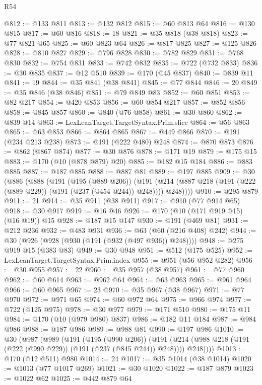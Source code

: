 \begin{lexlean}{R54}
\begin{coremodule}
@812 := @133 @811
@813 := @132 @812
@815 := @60 @813 @64
@816 := @130 @815
@817 := @60 @816
@818 := 18
@821 := @35 @818 (@38 @818)
@823 := @77 @821 @65
@825 := @60 @823 @64
@826 := @817 @825
@827 := @125 @826
@828 := @810 @827
@829 := @796 @828
@830 := @782 @829
@831 := @768 @830
@832 := @754 @831
@833 := @742 @832
@835 := @722 (@732 @833)
@836 := @30 @835
@837 := @12 @510
@839 := @170 (@45 @837)
@840 := @839 @11
@841 := 19
@844 := @35 @841 (@38 @841)
@845 := @77 @844
@846 := 20
@849 := @35 @846 (@38 @846)
@851 := @79 @849 @83
@852 := @60 @851
@853 := @82 @217
@854 := @420 @853
@856 := @60 @854 @217
@857 := @852 @856
@858 := @845 @857
@860 := @840 (@76 @858)
@861 := @30 @860
@862 := @839 @14
@863 := LexLeanTarget.TargetSyntax.Prim.slice
@864 := @56 @863
@865 := @63 @853
@866 := @864 @865
@867 := @449 @866
@870 := @191 (@234 @213 @238)
@873 := @191 (@222 @480) @248
@874 := @870 @873
@876 := @862 (@867 @874)
@877 := @30 @876
@878 := @171 @19
@879 := @175 @15
@883 := @170 (@10 (@878 @879) @20)
@885 := @182 @15 @184
@886 := @883 @885
@887 := @187 @885
@888 := @887 @81
@889 := @197 @885
@909 := @30
    (@886
      (@888
        (@191
          (@195 (@889 @206))
          (@191 (@214 (@887 @218 (@191 (@222 (@889 @229)) (@191 (@237 (@454 @244)) @248)))) @248))))
@910 := @295 @879
@911 := 21
@914 := @35 @911 (@38 @911)
@917 := @910 (@77 @914 @65)
@918 := @30 @917
@919 := @16 @46
@926 := @170 (@10 (@171 @919 @15) (@16 @19)) @15
@928 := @187 @15 @147
@930 := @191 (@469 @81)
@931 := @212 @236
@932 := @483 @931
@936 := @63 (@60 (@216 @408) @242)
@944 := @30 (@926 (@928 (@930 (@191 (@932 (@497 @936)) @248))))
@948 := @275 @919 @15 (@383 @83)
@949 := @30 @948
@951 := @512 (@175 @525)
@952 := LexLeanTarget.TargetSyntax.Prim.index
@955 := @951 (@56 @952 @282)
@956 := @30 @955
@957 := 22
@960 := @35 @957 (@38 @957)
@961 := @77 @960
@962 := @60 @614
@963 := @962 @64
@964 := @63 @963
@965 := @961 @964
@966 := @60 @965
@967 := 23
@970 := @35 @967 (@38 @967)
@971 := @77 @970
@972 := @971 @65
@974 := @60 @972 @64
@975 := @966 @974
@977 := @722 (@125 @975)
@978 := @30 @977
@979 := @171 @510
@980 := @175 @11
@984 := @170 (@10 (@979 @980) @837)
@986 := @182 @11 @184
@987 := @984 @986
@988 := @187 @986
@989 := @988 @81
@990 := @197 @986
@1010 := @30
    (@987
      (@989
        (@191
          (@195 (@990 @206))
          (@191 (@214 (@988 @218 (@191 (@222 (@990 @229)) (@191 (@237 (@845 @244)) @248)))) @248))))
@1013 := @170 (@12 @511) @980
@1014 := 24
@1017 := @35 @1014 (@38 @1014)
@1020 := @1013 (@77 @1017 @269)
@1021 := @30 @1020
@1022 := @187 @879
@1023 := @1022 @62
@1025 := @442 @879 @64

\end{coremodule}
\end{lexlean}
